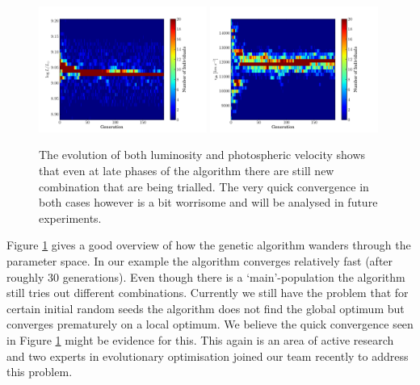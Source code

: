 \begin{figure}[t!] %
   \centering
   \includegraphics[width=0.49\textwidth]{chapter_dalek/plots/plot_02bo_lum_evol.pdf} 
   \includegraphics[width=0.49\textwidth]{chapter_dalek/plots/plot_02bo_vph_evol.pdf} 
   \caption[Evolution of both luminosity and photospheric velocity over generations]{The evolution of both luminosity and photospheric velocity shows that even at late phases of the algorithm there are still new combination that are being trialled. The very quick convergence in both cases however is a bit worrisome and will be analysed in future experiments.}
   \label{fig:lumvph_evolution}
\end{figure}


Figure \ref{fig:lumvph_evolution} gives a good overview of how the genetic algorithm wanders through the parameter space. In our example the algorithm converges relatively fast (after roughly 30 generations). Even though there is a `main'-population the algorithm still tries out different combinations. Currently we still have the problem that for certain initial random seeds the algorithm does not find the global optimum but converges prematurely on a local optimum. We believe the quick convergence seen in Figure \ref{fig:lumvph_evolution} might be evidence for this. This again is an area of active research and two experts in evolutionary optimisation joined our team recently to address this problem. 


